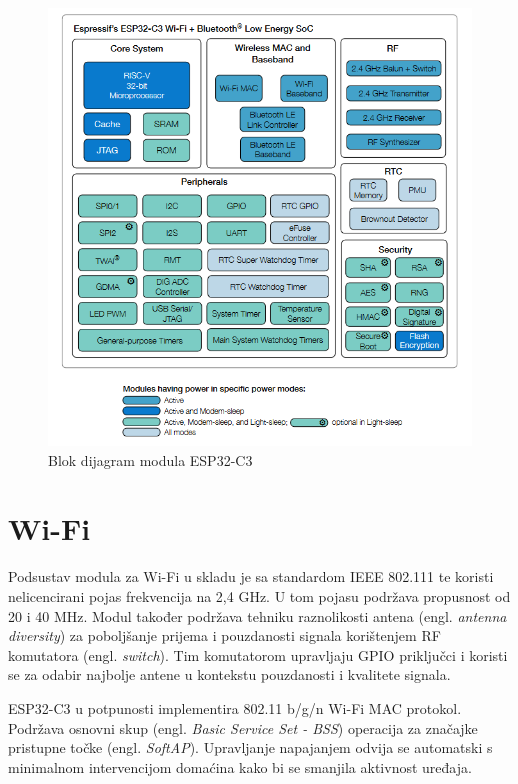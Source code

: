 \begin{figure}[ht]
	\centering
	\includegraphics[scale=0.6]{imgs/esp32block}
	\caption{Blok dijagram modula ESP32-C3 \cite{esp32manual}}
	\label{fig:esp32block}
\end{figure}

\section{Wi-Fi}

Podsustav modula za Wi-Fi u skladu je sa standardom IEEE 802.111 te koristi nelicencirani pojas frekvencija na 2,4 GHz. U tom pojasu podržava propusnost od 20 i 40 MHz. Modul također podržava tehniku raznolikosti antena (engl. \textit{antenna diversity}) za poboljšanje prijema i pouzdanosti signala korištenjem RF komutatora (engl. \textit{switch}). Tim komutatorom upravljaju GPIO priključci i koristi se za odabir najbolje antene u kontekstu pouzdanosti i kvalitete signala. 

ESP32-C3 u potpunosti implementira 802.11 b/g/n Wi-Fi MAC protokol. Podržava osnovni skup (engl. \textit{Basic Service Set - BSS}) operacija za značajke pristupne točke (engl. \textit{SoftAP}). Upravljanje napajanjem odvija se automatski s minimalnom intervencijom domaćina kako bi se smanjila aktivnost uređaja.

